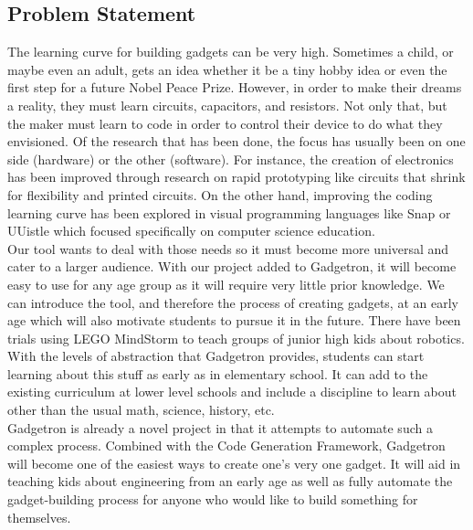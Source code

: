 \documentclass[12pt]{article}
\begin{document}
	\subsection{Problem Statement}
	The learning curve for building gadgets can be very high. Sometimes a child, or maybe even an adult, gets an idea whether it be a tiny hobby idea or even the first step for a future Nobel Peace Prize. However, in order to make their dreams a reality, they must learn circuits, capacitors, and resistors. Not only that, but the maker must learn to code in order to control their device to do what they envisioned. Of the research that has been done, the focus has usually been on one side (hardware) or the other (software). For instance, the creation of electronics has been improved through research on rapid prototyping like circuits that shrink for flexibility\cite{shrinky} and printed circuits\cite{inkjets}. On the other hand, improving the coding learning curve has been explored in visual programming languages like Snap or UUistle which focused specifically on computer science education\cite{UUistle}.\\[7pt]
Our tool wants to deal with those needs so it must become more universal and cater to a larger audience. With our project added to Gadgetron, it will become easy to use for any age group as it will require very little prior knowledge. We can introduce the tool, and therefore the process of creating gadgets, at an early age which will also motivate students to pursue it in the future. There have been trials using LEGO MindStorm to teach groups of junior high kids about robotics\cite{legomindstorms}. With the levels of abstraction that Gadgetron provides, students can start learning about this stuff as early as in elementary school. It can add to the existing curriculum at lower level schools and include a discipline to learn about other than the usual math, science, history, etc.\\[7pt]
Gadgetron is already a novel project in that it attempts to automate such a complex process. Combined with the Code Generation Framework, Gadgetron will become one of the easiest ways to create one's very one gadget. It will aid in teaching kids about engineering from an early age as well as fully automate the gadget-building process for anyone who would like to build something for themselves.
\end{document}
